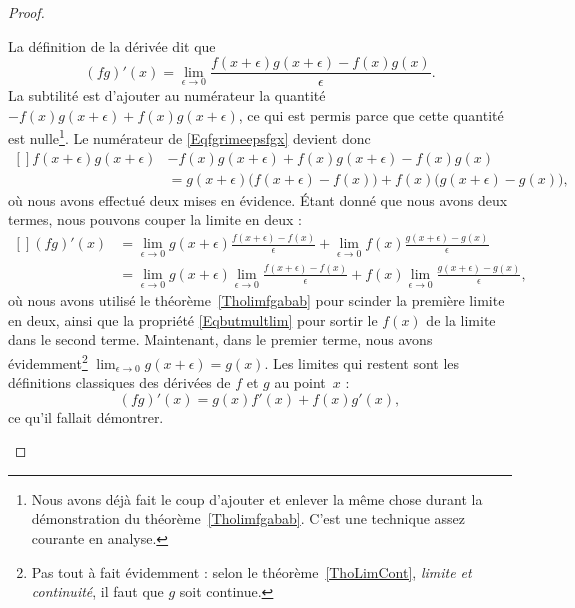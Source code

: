 \begin{proof}
\begin{subproof}
		La définition de la dérivée dit que
		\begin{equation}        \label{Eqfgrimeepsfgx}
			(fg)'(x)=\lim_{\epsilon\to 0}\frac{f(x+\epsilon)g(x+\epsilon)-f(x)g(x)}{\epsilon}.
		\end{equation}
		La subtilité est d'ajouter au numérateur la quantité \( -f(x)g(x+\epsilon)+f(x)g(x+\epsilon)\), ce qui est permis parce que cette quantité est nulle\footnote{Nous avons déjà fait le coup d'ajouter et enlever la même chose durant la démonstration du théorème~\ref{Tholimfgabab}. C'est une technique assez courante en analyse.}. Le numérateur de \eqref{Eqfgrimeepsfgx} devient donc
		\begin{equation}
			\begin{aligned}[]
				f(x+\epsilon)g(x+\epsilon) & -f(x)g(x+\epsilon)+f(x)g(x+\epsilon)-f(x)g(x)                                     \\
				                           & = g(x+\epsilon)\big( f(x+\epsilon)-f(x) \big)+f(x)\big( g(x+\epsilon)-g(x) \big),
			\end{aligned}
		\end{equation}
		où nous avons effectué deux mises en évidence. Étant donné que nous avons deux termes, nous pouvons couper la limite en deux :
		\begin{equation}
			\begin{aligned}[]
				(fg)'(x) & =\lim_{\epsilon\to 0}g(x+\epsilon)\frac{ f(x+\epsilon)-f(x) }{\epsilon}                      +  \lim_{\epsilon\to 0}f(x)\frac{ g(x+\epsilon)-g(x) }{\epsilon}  \\
				         & =\lim_{\epsilon\to 0}g(x+\epsilon)\lim_{\epsilon\to 0}\frac{ f(x+\epsilon)-f(x) }{\epsilon}  +  f(x)\lim_{\epsilon\to 0}\frac{ g(x+\epsilon)-g(x) }{\epsilon},
			\end{aligned}
		\end{equation}
		où nous avons utilisé le théorème~\ref{Tholimfgabab} pour scinder la première limite en deux, ainsi que la propriété \eqref{Eqbutmultlim} pour sortir le \( f(x)\) de la limite dans le second terme. Maintenant, dans le premier terme, nous avons évidemment\footnote{Pas tout à fait évidemment : selon le théorème~\ref{ThoLimCont}, \emph{limite et continuité}, il faut que \( g\) soit continue.} \( \lim_{\epsilon\to 0}g(x+\epsilon)=g(x)\). Les limites qui restent sont les définitions classiques des dérivées de \( f\) et \( g\) au point~\( x\) :
		\begin{equation}
			(fg)'(x)=g(x)f'(x)+f(x)g'(x),
		\end{equation}
		ce qu'il fallait démontrer.


\end{subproof}
\end{proof}
